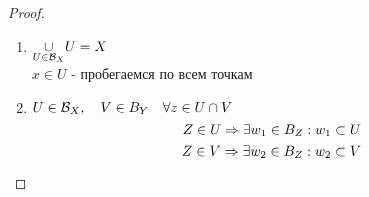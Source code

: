 \documentclass[geometry.tex]{subfiles}
\begin{document}
  \begin{proof}
    \begin{enumerate}
        \item $\underset{U \in \mathcal{B}_X}{\cup} U = X$\\
        $x \in U$ - пробегаемся по всем точкам
        \item $U \in \mathcal{B}_X,\quad V \in B_Y\quad \forall z \in U \cap V$
        \[Z \in U \Rightarrow \exists w_1 \in B_Z: w_1 \subset U\]
        \[Z \in V \Rightarrow \exists w_2 \in B_Z: w_2 \subset V\]
    \end{enumerate}
  \end{proof}
\end{document}
